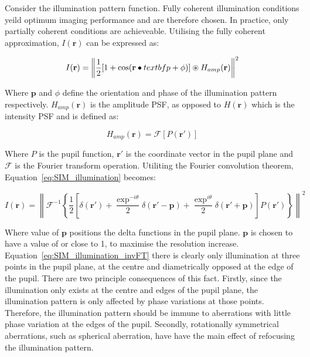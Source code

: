 Consider the illumination pattern function. Fully coherent
illumination conditions yeild optimum imaging performance and
are therefore chosen. In practice, only partially coherent 
conditions are achieveable. Utilising the fully coherent 
approximation, $I(\textbf{r})$ can be expressed as:

\begin{equation}\label{eq:SIM_illumination}
	I(\textbf{r}) = \left\| \frac{1}{2}[1 + \cos(\textbf{r}\bullet\\textbf{p} + \phi)]\circledast H_{amp}(\textbf{r}) \right\|^{2}
\end{equation}

Where $\textbf{p}$ and $\phi$ define the orientation and phase of
the illumination pattern respectively. $H_{amp}(\textbf{r})$ is the
amplitude PSF, as opposed to $H(\textbf{r})$ which is the intensity
PSF and is defined as:

\begin{equation}\label{eq:amplitude_PSF}
	H_{amp}(\textbf{r}) = \mathcal{F}[P(\textbf{r}')]
\end{equation}

Where $P$ is the pupil function, $\textbf{r}'$ is the coordinate
vector in the pupil plane and $\mathcal{F}$ is the Fourier
transform operation. Utiliting the Fourier convolution 
theorem, Equation~\ref{eq:SIM_illumination} becomes:

\begin{equation}\label{eq:SIM_illumination_invFT}
I(\textbf{r}) = \left\| \mathcal{F}^{-1}\left\{\frac{1}{2}\left[\delta(\textbf{r}') + \frac{\exp^{-i\theta}}{2}\delta(\textbf{r}'-\textbf{p}) + \frac{\exp^{i\theta}}{2}\delta(\textbf{r}'+\textbf{p})\right]P(\textbf{r}')\right\} \right\|^{2}
\end{equation}

Where value of $\textbf{p}$ positions the delta functions in the
pupil plane. $\textbf{p}$ is chosen to have a value of or close
to 1, to maximise the resolution increase. 
Equation~\ref{eq:SIM_illumination_invFT} there is clearly only
illumination at three points in the pupil plane, at the centre 
and diametrically opposed at the edge of the pupil. There are
two principle consequences of this fact. Firstly, since the 
illumination only exists at the centre and edges of the pupil
plane, the illumination pattern is only affected by phase 
variations at those points. Therefore, the illumination pattern
should be immune to aberrations with little phase variation at 
the edges of the pupil. Secondly, rotationally symmetrical 
aberrations, such as spherical aberration, have have the main
effect of refocusing the illumination pattern.\cite{booth2015aberrations}

